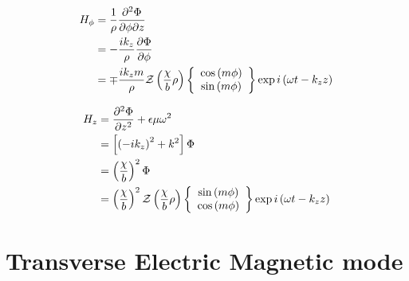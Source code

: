 \documentclass[twoside, a4paper]{article}
\begin{document}
\begin{align*}
H_\phi & = \frac{1}{\rho} \frac{\partial^2 \Phi}{\partial \phi \partial z} \\
& = - \frac{i k_z}{\rho} \frac{\partial \Phi}{\partial \phi} \\
& = \mp \frac{i k_z m}{\rho} 
	\mathcal{Z} \left( \frac{\chi}{b} \rho \right)
	\left\{
	\begin{array}{c}
		\cos \left( m \phi \right) \\
		\sin \left( m \phi \right)
	\end{array}
	\right\}
	\exp i \left( \omega t - k_z z \right)
\end{align*}

\begin{align*}
H_z & = \frac{\partial^2 \Phi}{\partial z^2} + \epsilon \mu \omega^2 \\
	& = \left[ \left( - i k_z \right)^2 + k^2 \right] \Phi \\
	& = \left( \frac{\chi}{b} \right)^2 \Phi \\
	& = \left( \frac{\chi}{b} \right)^2
	\mathcal{Z} \left( \frac{\chi}{b} \rho \right)
	\left\{
	\begin{array}{c}
		\sin \left( m \phi \right) \\
		\cos \left( m \phi \right)
	\end{array}
	\right\}
	\exp i \left( \omega t - k_z z \right)
\end{align*}

\section{Transverse Electric Magnetic mode}
\label{sec:TEM}
\end{document}
